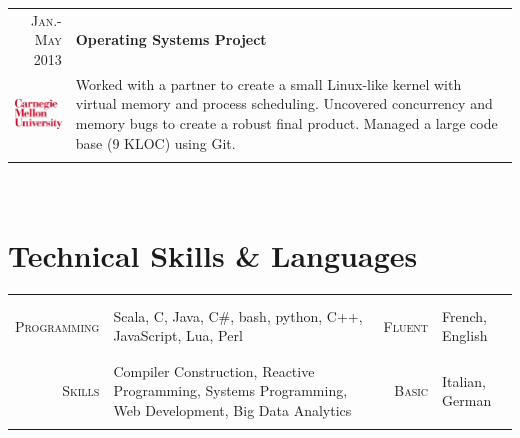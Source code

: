 \documentclass[a4paper,11pt]{article} %
\begin{document}
\begin{tabularx}{\textwidth}{r|X}

\textsc{Jan.-May 2013} & \textbf{Operating Systems Project}\\
\multirow{3}{*}{ \includegraphics[width=55pt]{img/cmu.eps}}
& \footnotesize{Worked with a partner to create a small Linux-like kernel
with virtual memory and process scheduling. Uncovered concurrency and memory
bugs to create a robust final product. Managed a large code base (9 KLOC) using Git.}\\
\\


\end{tabularx}
\\


\section{Technical Skills \& Languages}
\begin{center}

\vspace{-0.3cm}
\begin{tabularx}{\textwidth}{rX|rl}

& & & \\
& & & \\
\textsc{\large{Programming}} & Scala, C, Java, C\#, bash, python, C++, JavaScript,
Lua, Perl &
\textsc{\large{Fluent}} & French, English \\
& & & \\
& & & \\
\textsc{\large{Skills}} & Compiler Construction, Reactive Programming, 
Systems Programming, Web Development, Big Data Analytics &
\textsc{\large{Basic}} & Italian, German \\
& & & \\

\end{tabularx}

\end{center}
\end{document}
